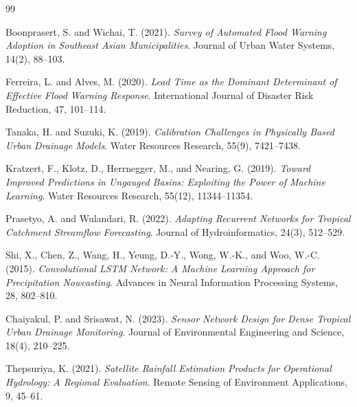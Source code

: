 \documentclass[12pt,a4paper]{report}
\begin{document}
\begin{thebibliography}{99}

Boonprasert, S. and Wichai, T. (2021). \textit{Survey of Automated Flood Warning Adoption in Southeast Asian Municipalities}. Journal of Urban Water Systems, 14(2), 88--103.

Ferreira, L. and Alves, M. (2020). \textit{Lead Time as the Dominant Determinant of Effective Flood Warning Response}. International Journal of Disaster Risk Reduction, 47, 101--114.

Tanaka, H. and Suzuki, K. (2019). \textit{Calibration Challenges in Physically Based Urban Drainage Models}. Water Resources Research, 55(9), 7421--7438.

Kratzert, F., Klotz, D., Herrnegger, M., and Nearing, G. (2019). \textit{Toward Improved Predictions in Ungauged Basins: Exploiting the Power of Machine Learning}. Water Resources Research, 55(12), 11344--11354.

Prasetyo, A. and Wulandari, R. (2022). \textit{Adapting Recurrent Networks for Tropical Catchment Streamflow Forecasting}. Journal of Hydroinformatics, 24(3), 512--529.

Shi, X., Chen, Z., Wang, H., Yeung, D.-Y., Wong, W.-K., and Woo, W.-C. (2015). \textit{Convolutional LSTM Network: A Machine Learning Approach for Precipitation Nowcasting}. Advances in Neural Information Processing Systems, 28, 802--810.

Chaiyakul, P. and Srisawat, N. (2023). \textit{Sensor Network Design for Dense Tropical Urban Drainage Monitoring}. Journal of Environmental Engineering and Science, 18(4), 210--225.

Thepsuriya, K. (2021). \textit{Satellite Rainfall Estimation Products for Operational Hydrology: A Regional Evaluation}. Remote Sensing of Environment Applications, 9, 45--61.

\end{thebibliography}

\appendix
\end{document}
